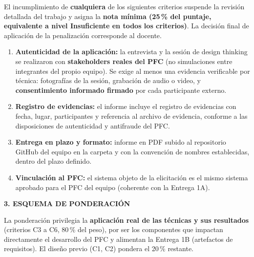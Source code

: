 \documentclass[10pt,a4paper]{article}
\begin{document}
\vspace{8pt}
\begin{tcolorbox}[colback=lightred,colframe=red!60!black,
  title=\textbf{2. CRITERIOS DE ADMISIÓN (GATEKEEPER) --- verificación previa a la revisión},
  fonttitle=\bfseries,boxrule=0.8pt,arc=2mm]
El incumplimiento de \textbf{cualquiera} de los siguientes criterios suspende la revisión detallada del trabajo y asigna la \textbf{nota mínima (25\,\% del puntaje, equivalente a nivel Insuficiente en todos los criterios)}. La decisión final de aplicación de la penalización corresponde al docente.
\begin{enumerate}[leftmargin=18pt,itemsep=2pt]
  \item \textbf{Autenticidad de la aplicación:} la entrevista y la sesión de design thinking se realizaron con \textbf{stakeholders reales del PFC} (no simulaciones entre integrantes del propio equipo). Se exige al menos una evidencia verificable por técnica: fotografías de la sesión, grabación de audio o video, y \textbf{consentimiento informado firmado} por cada participante externo.
  \item \textbf{Registro de evidencias:} el informe incluye el registro de evidencias con fecha, lugar, participantes y referencia al archivo de evidencia, conforme a las disposiciones de autenticidad y antifraude del PFC.
  \item \textbf{Entrega en plazo y formato:} informe en PDF subido al repositorio GitHub del equipo en la carpeta y con la convención de nombres establecidas, dentro del plazo definido.
  \item \textbf{Vinculación al PFC:} el sistema objeto de la elicitación es el mismo sistema aprobado para el PFC del equipo (coherente con la Entrega 1A).
\end{enumerate}
\end{tcolorbox}

\vspace{4pt}
\textbf{\textcolor{uteqgreen}{3. ESQUEMA DE PONDERACIÓN}}

\vspace{2pt}
La ponderación privilegia la \textbf{aplicación real de las técnicas y sus resultados} (criterios C3 a C6, 80\,\% del peso), por ser los componentes que impactan directamente el desarrollo del PFC y alimentan la Entrega 1B (artefactos de requisitos). El diseño previo (C1, C2) pondera el 20\,\% restante.
\end{document}
